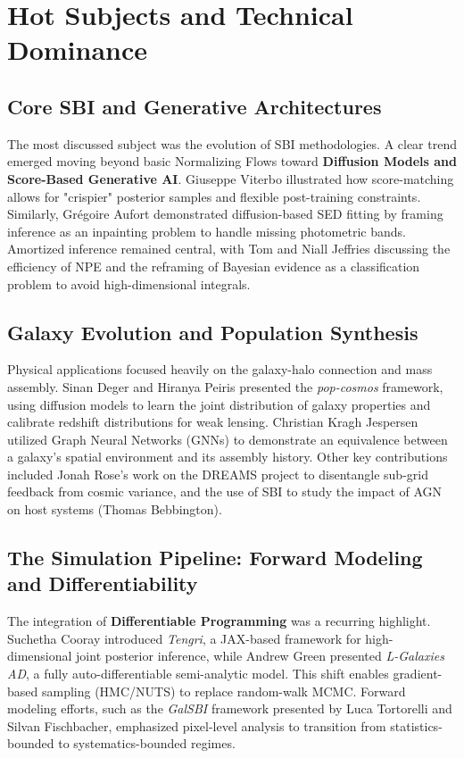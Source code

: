 \documentclass[11pt]{article}
\begin{document}
\section{Hot Subjects and Technical Dominance}

\subsection{Core SBI and Generative Architectures}
The most discussed subject was the evolution of SBI methodologies. A clear trend emerged moving beyond basic Normalizing Flows toward \textbf{Diffusion Models and Score-Based Generative AI}. Giuseppe Viterbo illustrated how score-matching allows for "crispier" posterior samples and flexible post-training constraints. Similarly, Grégoire Aufort demonstrated diffusion-based SED fitting by framing inference as an inpainting problem to handle missing photometric bands. Amortized inference remained central, with Tom and Niall Jeffries discussing the efficiency of NPE and the reframing of Bayesian evidence as a classification problem to avoid high-dimensional integrals.

\subsection{Galaxy Evolution and Population Synthesis}
Physical applications focused heavily on the galaxy-halo connection and mass assembly. Sinan Deger and Hiranya Peiris presented the \textit{pop-cosmos} framework, using diffusion models to learn the joint distribution of galaxy properties and calibrate redshift distributions for weak lensing. Christian Kragh Jespersen utilized Graph Neural Networks (GNNs) to demonstrate an equivalence between a galaxy's spatial environment and its assembly history. Other key contributions included Jonah Rose's work on the DREAMS project to disentangle sub-grid feedback from cosmic variance, and the use of SBI to study the impact of AGN on host systems (Thomas Bebbington).

\subsection{The Simulation Pipeline: Forward Modeling and Differentiability}
The integration of \textbf{Differentiable Programming} was a recurring highlight. Suchetha Cooray introduced \textit{Tengri}, a JAX-based framework for high-dimensional joint posterior inference, while Andrew Green presented \textit{L-Galaxies AD}, a fully auto-differentiable semi-analytic model. This shift enables gradient-based sampling (HMC/NUTS) to replace random-walk MCMC. Forward modeling efforts, such as the \textit{GalSBI} framework presented by Luca Tortorelli and Silvan Fischbacher, emphasized pixel-level analysis to transition from statistics-bounded to systematics-bounded regimes.
\end{document}
